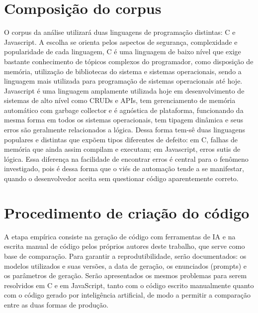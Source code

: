 \section{Composição do corpus}
O corpus da análise utilizará duas linguagens de programação distintas: C e 
Javascript. A escolha se orienta pelos aspectos de segurança, complexidade e popularidade de cada linguagem, C é uma linguagem de baixo nível que exige 
bastante conhecimento de tópicos complexos do programador, como disposição de 
memória, utilização de bibliotecas do sistema e sistemas operacionais, sendo a 
linguagem mais utilizada para programação de sistemas operacionais até hoje. 
Javascript é uma linguagem amplamente utilizada hoje em desenvolvimento de 
sistemas de alto nível como CRUDs e APIs, tem gerenciamento de memória 
automático com garbage collector e é agnóstica de plataforma, funcionando da 
mesma forma em todos os sistemas operacionais, tem tipagem dinâmica e seus 
erros são geralmente relacionados a lógica.  
Dessa forma tem-sê duas linguagens populares e distintas que expõem tipos 
diferentes de defeito: em C, falhas de memória que ainda assim compilam e 
executam; em Javascript, erros sutis de lógica. Essa diferença na facilidade de 
encontrar erros é central para o fenômeno investigado, pois é dessa forma que o 
viés de automação tende a se manifestar, quando o desenvolvedor aceita sem 
questionar código aparentemente correto.

\section{Procedimento de criação do código}

A etapa empírica consiste na geração de código com ferramentas de IA e na 
escrita manual de código pelos próprios autores deste trabalho, que serve como 
base de comparação. Para garantir a reprodutibilidade, serão documentados: os 
modelos utilizados e suas versões, a data de geração, os enunciados (prompts) e os 
parâmetros de geração. 
Serão apresentados os mesmos problemas para serem resolvidos em C e em 
JavaScript, tanto com o código escrito manualmente quanto com o código gerado 
por inteligência artificial, de modo a permitir a comparação entre as duas formas de 
produção.